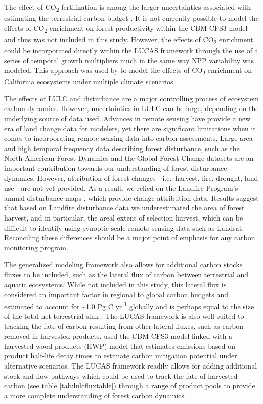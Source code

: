 \documentclass[
]{book}
\begin{document}
The effect of CO\textsubscript{2} fertilization is among the larger uncertainties associated with estimating the terrestrial carbon budget \citep{smith2016large}. It is not currently possible to model the effects of CO\textsubscript{2} enrichment on forest productivity within the CBM-CFS3 model and thus was not included in this study. However, the effects of CO\textsubscript{2} enrichment could be incorporated directly within the LUCAS framework through the use of a series of temporal growth multipliers much in the same way NPP variability was modeled. This approach was used by \citet{sleeter2019effects} to model the effects of CO\textsubscript{2} enrichment on California ecosystems under multiple climate scenarios.

The effects of LULC and disturbance are a major controlling process of ecosystem carbon dynamics. However, uncertainties in LULC can be large, depending on the underlying source of data used. Advances in remote sensing have provide a new era of land change data for modelers, yet there are significant limitations when it comes to incorporating remote sensing data into carbon assessments. Large area and high temporal frequency data describing forest disturbance, such as the North American Forest Dynamics \citep{goward2012nacp}and the Global Forest Change \citep{hansen2013high} datasets are an important contribution towards our understanding of forest disturbance dynamics. However, attribution of forest changes - i.e.~harvest, fire, drought, land use - are not yet provided. As a result, we relied on the Landfire Program's annual disturbance maps \citep{landfire2014disturbance}, which provide change attribution data. Results suggest that based on Landfire disturbance data we underestimated the area of forest harvest, and in particular, the areal extent of selection harvest, which can be difficult to identify using synoptic-scale remote sensing data such as Landsat. Reconciling these differences should be a major point of emphasis for any carbon monitoring program.

The generalized modeling framework also allows for additional carbon stocks fluxes to be included, such as the lateral flux of carbon between terrestrial and aquatic ecosystems. While not included in this study, this lateral flux is considered an important factor in regional to global carbon budgets and estimated to account for \textasciitilde1.0 Pg C yr\textsuperscript{-1} globally \citep{regnier2013anthropogenic} and is perhaps equal to the size of the total net terrestrial sink \citep{ciais2008impact}. The LUCAS framework is also well suited to tracking the fate of carbon resulting from other lateral fluxes, such as carbon removed in harvested products. \citet{smyth2014quantifying} used the CBM-CFS3 model linked with a harvested wood products (HWP) model that estimates emissions based on product half-life decay times to estimate carbon mitigation potential under alternative scenarios. The LUCAS framework readily allows for adding additional stock and flow pathways which could be used to track the fate of harvested carbon (see table \ref{tab:lulcfluxtable}) through a range of product pools to provide a more complete understanding of forest carbon dynamics.
\end{document}
